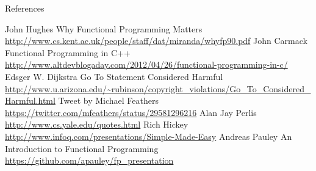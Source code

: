 \documentclass{beamer}
\begin{document}
\begin{frame}[allowframebreaks]{References}
  \begin{thebibliography}{10}
      John Hughes
      \newblock Why Functional Programming Matters
      \newblock \url{http://www.cs.kent.ac.uk/people/staff/dat/miranda/whyfp90.pdf}
      John Carmack
      \newblock Functional Programming in C++
      \newblock \url{http://www.altdevblogaday.com/2012/04/26/functional-programming-in-c/}
      Edsger W. Dijkstra
      \newblock Go To Statement Considered Harmful
      \newblock \url{http://www.u.arizona.edu/~rubinson/copyright_violations/Go_To_Considered_Harmful.html}
      Tweet by Michael Feathers
      \newblock \url{https://twitter.com/mfeathers/status/29581296216}
      Alan Jay Perlis
      \newblock \url{http://www.cs.yale.edu/quotes.html}
      Rich Hickey
      \newblock \url{http://www.infoq.com/presentations/Simple-Made-Easy}
      Andreas Pauley
      \newblock An Introduction to Functional Programming
      \newblock \url{https://github.com/apauley/fp_presentation}
  \end{thebibliography}
\end{frame}
\end{document}
